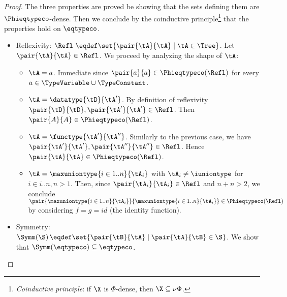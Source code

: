 \begin{proof}
The three properties are proved be showing that the sets defining them are
$\Phieqtypeco$-dense. Then we conclude by the coinductive
principle\footnote{\emph{Coinductive principle}: if $\X$ is $\Phi$-dense, then
$\X \subseteq \nu\Phi$.} that the properties hold on $\eqtypeco$.
\begin{itemize}
  \item Reflexivity: $\Refl\ \eqdef \set{\pair{\tA}{\tA} \mathrel| \tA \in
  \Tree}$. Let $\pair{\tA}{\tA} \in \Refl$. We proceed by analyzing the shape
  of $\tA$:
  \begin{itemize}
    \item $\tA = a$. Immediate since $\pair{a}{a} \in \Phieqtypeco(\Refl)$ for
    every $a \in \TypeVariable \cup \TypeConstant$.
    
    \item $\tA = \datatype{\tD}{\tA'}$. By definition of reflexivity
    $\pair{\tD}{\tD}, \pair{\tA'}{\tA'} \in \Refl$. Then $\pair{A}{A} \in
    \Phieqtypeco\!\left(\Refl\right)$.
    
    \item $\tA = \functype{\tA'}{\tA''}$. Similarly to the previous case, we
    have $\pair{\tA'}{\tA'}, \pair{\tA''}{\tA''} \in \Refl$. Hence
    $\pair{\tA}{\tA} \in \Phieqtypeco\!\left(\Refl\right)$.
    
    \item $\tA = \maxuniontype{i \in 1..n}{\tA_i}$ with $\tA_i \neq \iuniontype$
    for $i \in i..n, n > 1$. Then, since $\pair{\tA_i}{\tA_i} \in \Refl$ and
    $n + n > 2$, we conclude
    $\pair{\maxuniontype{i \in 1..n}{\tA_i}}{\maxuniontype{i \in 1..n}{\tA_i}}
    \in \Phieqtypeco\!\left(\Refl\right)$ by considering $f = g = \mathit{id}$
    (the identity function).
  \end{itemize}
  
  
  \item Symmetry: $\Symm\!\left(\S\right) \eqdef \set{\pair{\tB}{\tA} \mathrel|
  \pair{\tA}{\tB} \in \S}$. We show that $\Symm\!\left(\eqtypeco\right)
  \subseteq \mathbin{\eqtypeco}$.
  

\end{itemize}
\end{proof}
